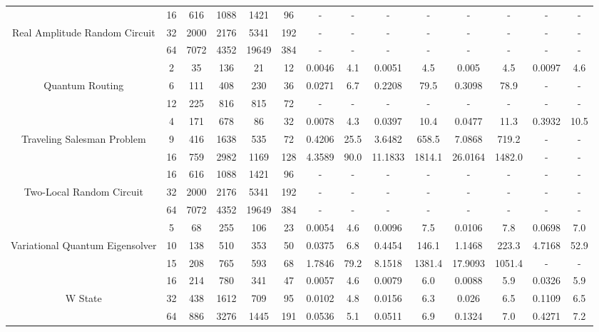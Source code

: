 \begin{table}[htb]
{\begin{tabular}{|c|c|c|c|c|c|c|c|c|c|c|c|c|c|}
\hline
 & 
16 & 616 & 1088 & 1421 & 96
 & - & -
 & - & -
 & - & -
 & - & -
 \\
Real Amplitude Random Circuit & 
32 & 2000 & 2176 & 5341 & 192
 & - & -
 & - & -
 & - & -
 & - & -
 \\
 & 
64 & 7072 & 4352 & 19649 & 384
 & - & -
 & - & -
 & - & -
 & - & -
 \\
\hline
 & 
2 & 35 & 136 & 21 & 12
 & 0.0046 & 4.1
 & 0.0051 & 4.5
 & 0.005 & 4.5
 & 0.0097 & 4.6
 \\
Quantum Routing & 
6 & 111 & 408 & 230 & 36
 & 0.0271 & 6.7
 & 0.2208 & 79.5
 & 0.3098 & 78.9
 & - & -
 \\
 & 
12 & 225 & 816 & 815 & 72
 & - & -
 & - & -
 & - & -
 & - & -
 \\
\hline
 & 
4 & 171 & 678 & 86 & 32
 & 0.0078 & 4.3
 & 0.0397 & 10.4
 & 0.0477 & 11.3
 & 0.3932 & 10.5
 \\
Traveling Salesman Problem & 
9 & 416 & 1638 & 535 & 72
 & 0.4206 & 25.5
 & 3.6482 & 658.5
 & 7.0868 & 719.2
 & - & -
 \\
 & 
16 & 759 & 2982 & 1169 & 128
 & 4.3589 & 90.0
 & 11.1833 & 1814.1
 & 26.0164 & 1482.0
 & - & -
 \\
\hline
 & 
16 & 616 & 1088 & 1421 & 96
 & - & -
 & - & -
 & - & -
 & - & -
 \\
Two-Local Random Circuit & 
32 & 2000 & 2176 & 5341 & 192
 & - & -
 & - & -
 & - & -
 & - & -
 \\
 & 
64 & 7072 & 4352 & 19649 & 384
 & - & -
 & - & -
 & - & -
 & - & -
 \\
\hline
 & 
5 & 68 & 255 & 106 & 23
 & 0.0054 & 4.6
 & 0.0096 & 7.5
 & 0.0106 & 7.8
 & 0.0698 & 7.0
 \\
Variational Quantum Eigensolver & 
10 & 138 & 510 & 353 & 50
 & 0.0375 & 6.8
 & 0.4454 & 146.1
 & 1.1468 & 223.3
 & 4.7168 & 52.9
 \\
 & 
15 & 208 & 765 & 593 & 68
 & 1.7846 & 79.2
 & 8.1518 & 1381.4
 & 17.9093 & 1051.4
 & - & -
 \\
\hline
 & 
16 & 214 & 780 & 341 & 47
 & 0.0057 & 4.6
 & 0.0079 & 6.0
 & 0.0088 & 5.9
 & 0.0326 & 5.9
 \\
W State & 
32 & 438 & 1612 & 709 & 95
 & 0.0102 & 4.8
 & 0.0156 & 6.3
 & 0.026 & 6.5
 & 0.1109 & 6.5
 \\
 & 
64 & 886 & 3276 & 1445 & 191
 & 0.0536 & 5.1
 & 0.0511 & 6.9
 & 0.1324 & 7.0
 & 0.4271 & 7.2
 \\
\hline
\end{tabular}}
\end{table}